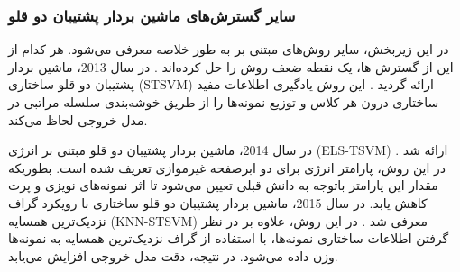 \subsubsection{سایر گسترش‌های ماشین بردار پشتیبان دو قلو}\label{sec:2:2:3:4}
در این زیربخش، سایر روش‌های مبتنی بر  به طور خلاصه معرفی می‌شود. هر کدام از این از گسترش ها، یک نقطه ضعف روش  را حل کرده‌اند \cite{ding2014,ding2017,huang2018}. در سال 2013، ماشین بردار پشتیبان دو قلو ساختاری (\gls{STSVM}) ارائه گردید \cite{qi2013}.  این روش یادگیری اطلاعات مفید ساختاری درون هر کلاس و توزیع نمونه‌ها را از طریق خوشه‌بندی سلسله مراتبی در مدل خروجی لحاظ می‌کند.  

در سال 2014، ماشین بردار پشتیبان دو قلو مبتنی بر انرژی (\gls{ELS-TSVM}) ارائه شد \cite{nasiri2014}. در این روش، پارامتر انرژی برای دو ابرصفحه غیرموازی تعریف شده است. بطوریکه مقدار این پارامتر باتوجه به دانش قبلی تعیین می‌شود تا اثر نمونه‌های نویزی و پرت کاهش یابد. در سال 2015، ماشین بردار پشتیبان دو قلو ساختاری با رویکرد گراف نزدیک‌ترین همسایه (\gls{KNN-STSVM}) معرفی شد \cite{pan2015}. در این روش، علاوه بر در نظر گرفتن اطلاعات ساختاری نمونه‌ها، با استفاده از گراف نزدیک‌ترین همسایه به نمونه‌ها وزن داده می‌شود. در نتیجه، دقت مدل خروجی افزایش می‌یابد.

